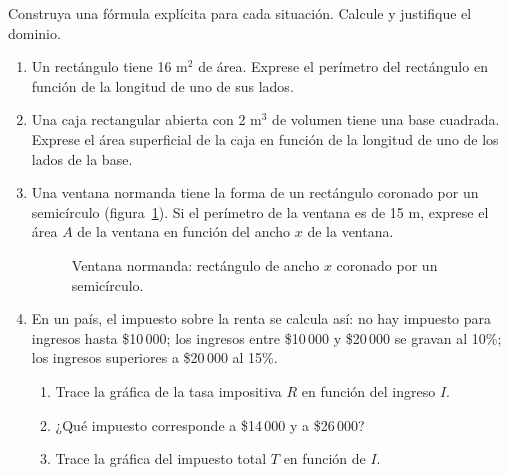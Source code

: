 \begin{prob} Construya una fórmula explícita para cada situación. Calcule y justifique el dominio.

\begin{enumerate}
\item Un rectángulo tiene 16 m\(^2\) de área. Exprese el perímetro del rectángulo en función de la longitud de uno de sus lados.

\item Una caja rectangular abierta con 2 m\(^3\) de volumen tiene una base cuadrada. Exprese el área superficial de la caja en función de la longitud de uno de los lados de la base.


\item Una ventana normanda tiene la forma de un rectángulo coronado por un semicírculo (figura~\ref{fig:ventana_normanda}). Si el perímetro de la ventana es de 15 m, exprese el área \( A \) de la ventana en función del ancho \( x \) de la ventana.

\begin{figure}[!htbp]
\centering
{}
\caption{Ventana normanda: rectángulo de ancho $x$ coronado por un semicírculo.}
\label{fig:ventana_normanda}
\end{figure}

\item En un país, el impuesto sobre la renta se calcula así: no hay impuesto para ingresos hasta \$10\,000; los ingresos entre \$10\,000 y \$20\,000 se gravan al 10\%; los ingresos superiores a \$20\,000 al 15\%.
    \begin{enumerate}
      \item Trace la gráfica de la tasa impositiva $R$ en función del ingreso $I$.
      \item ¿Qué impuesto corresponde a \$14\,000 y a \$26\,000?
      \item Trace la gráfica del impuesto total $T$ en función de $I$.
    \end{enumerate}


\end{enumerate}
\end{prob}
